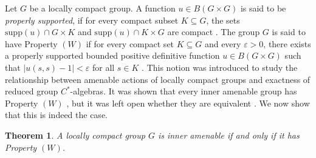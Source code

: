 \documentclass[preprint,12pt]{elsarticle}
\newtheorem{thm}{Theorem}[section]
\begin{document}
Let $G$ be a locally compact group. A function $u\in B(G\times G)$ is said to be \textit{properly supported}, if for every compact subset $K\subseteq G$, the sets $\mathrm{supp}(u)\cap G\times K$ and $\mathrm{supp}(u)\cap K\times G$ are compact \cite[Definition 4.2]{Claire}. The group $G$ is said to have Property $(W)$ if for every compact set $K\subseteq G$ and every $\varepsilon>0$, there exists a properly supported bounded positive definitive function $u\in B(G\times G)$ such that $|u(s,s)-1|<\varepsilon$ for all $s\in K$ \cite[Definition 4.3]{Claire}. This notion was introduced to study the relationship between amenable actions of locally compact groups and exactness of reduced group $C^*$-algebras. It was shown that every inner amenable group has Property $(W)$ \cite[Proposition 4.6]{Claire}, but it was left open whether they are equivalent \cite[Problem 9.1]{Claire}. We now show that this is indeed the case.

\begin{thm} A locally compact group $G$ is inner amenable if and only if it has Property $(W)$.\end{thm}
\end{document}

